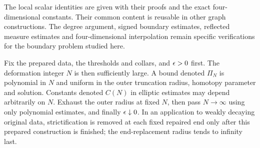 The local scalar identities are given with their proofs and the exact
four-dimensional constants. Their common content is reusable in other
graph constructions. The degree argument, signed boundary estimates,
reflected measure estimates and four-dimensional interpolation remain
specific verifications for the boundary problem studied here.

\begin{remark}\label{four:rem:constants}
Fix the prepared data, the thresholds and collars, and $\epsilon>0$ first.
The deformation integer $N$ is then sufficiently large. A bound denoted
$\Pi_N$ is polynomial in $N$ and uniform in the outer truncation radius,
homotopy parameter and solution. Constants denoted $C(N)$ in elliptic
estimates may depend arbitrarily on $N$. Exhaust the outer radius at
fixed $N$, then pass $N\to\infty$ using only polynomial estimates, and
finally $\epsilon\downarrow0$. In an application to weakly decaying original
data, strictification is removed at each fixed repaired end only after
this prepared construction is finished; the end-replacement radius
tends to infinity last.
\end{remark}
